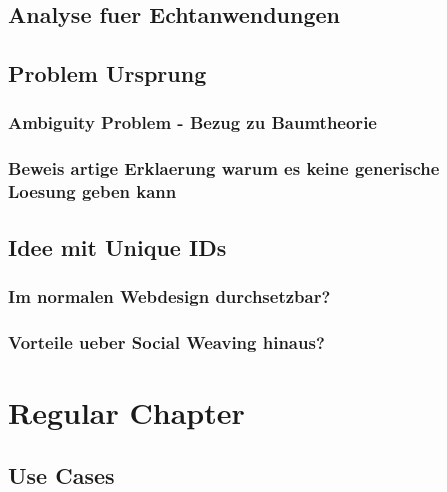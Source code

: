 \documentclass[]{article}
\begin{document}
\tableofcontents
\newpage


\listoffigures
\newpage
\listoftables
\newpage
\lstlistoflistings
\newpage


\newpage

\newpage

\newpage


\newpage

\newpage

\section{Analyse fuer Echtanwendungen}

\section{Problem Ursprung}
\subsection{Ambiguity Problem - Bezug zu Baumtheorie}
\subsection{Beweis artige Erklaerung warum es keine generische Loesung geben kann}


\section{Idee mit Unique IDs}
\subsection{Im normalen Webdesign durchsetzbar?}
\subsection{Vorteile ueber Social Weaving hinaus?}


\newpage

\newpage


\newpage

\newpage

\chapter{Regular Chapter}
\begin{appendices}
\chapter{Use Cases}

\end{appendices}



\nocite{*}
\end{document}
